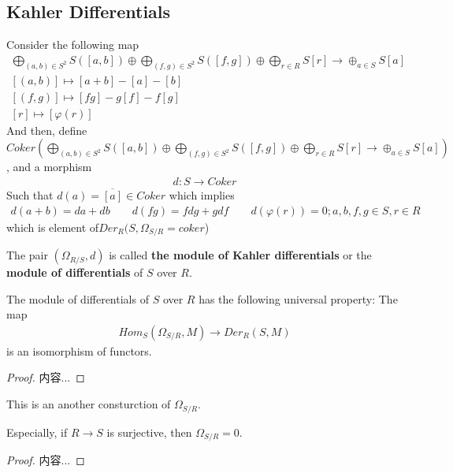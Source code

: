 \documentclass[Total.tex]{subfiles}
\begin{document}
		\subsection{Kahler Differentials}
		\begin{Def}
			Consider the following map
			\begin{gather*}
				\bigoplus_{(a,b)\in S^2} S([a,b])\oplus \bigoplus_{(f,g)\in S^2} S([f,g])\oplus \bigoplus_{r\in R} S[r]\rightarrow \oplus_{a\in S} S[a]\\
				[(a,b)]\mapsto [a+b]-[a]-[b]\\
				[(f,g)]\mapsto [fg]-g[f]-f[g]\\
				[r]\mapsto [\varphi(r)]
			\end{gather*}
			And then, define $Coker(\bigoplus_{(a,b)\in S^2} S([a,b])\oplus \bigoplus_{(f,g)\in S^2} S([f,g])\oplus \bigoplus_{r\in R} S[r]\rightarrow \oplus_{a\in S} S[a])$, and a morphism
			\begin{gather*}
				d:S\rightarrow Coker
			\end{gather*}
			Such that $d(a)=\overline{[a]}\in Coker$ which implies
			\begin{gather*}
				d(a+b)=da+db\qquad d(fg)=fdg+gdf\qquad d(\varphi(r))=0;a,b,f,g\in S,r\in R
			\end{gather*}
			which is element of$Der_R(S,\Omega_{S/R}=coker$)
			
			The pair $(\Omega_{R/S},d)$ is called \textbf{the module of Kahler differentials} or the \textbf{module of differentials} of $S$ over $R$.	
		\end{Def}
		\begin{lemma}
			The module of differentials of $S$ over $R$ has the following universal property: The map
			\begin{gather*}
				Hom_S(\Omega_{S/R},M)\rightarrow Der_R(S,M)
			\end{gather*}
			is an isomorphism of functors.
			\end{lemma}
		\begin{proof}
			内容...
		\end{proof}
		
		This is an another consturction of $\Omega_{S/R}$.
		
		\begin{proposition}
			Especially, if $R\rightarrow S$ is surjective, then $\Omega_{S/R}=0$.
		\end{proposition}
		\begin{proof}
			内容...
		\end{proof}
		
\end{document}
